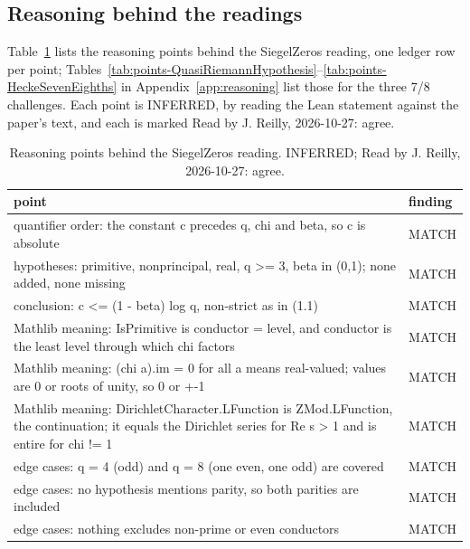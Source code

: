 \subsection{Reasoning behind the readings}

Table~\ref{tab:points-SiegelZeros} lists the reasoning points behind the SiegelZeros reading, one ledger row per point; Tables~\ref{tab:points-QuasiRiemannHypothesis}--\ref{tab:points-HeckeSevenEighths} in Appendix~\ref{app:reasoning} list those for the three 7/8 challenges. %
Each point is INFERRED, by reading the Lean statement against the paper's text, and each is marked Read by J. Reilly, 2026-10-27: agree. %

\begin{table}[!htbp]
\caption{Reasoning points behind the SiegelZeros reading. INFERRED; Read by J. Reilly, 2026-10-27: agree.}\label{tab:points-SiegelZeros} %
\scriptsize\setlength{\tabcolsep}{3pt}\renewcommand{\arraystretch}{0.95}
\begin{tabularx}{\textwidth}{@{}>{\raggedright\arraybackslash}Xl@{}}
\toprule
point & finding \\ %
\midrule
quantifier order: the constant c precedes q, chi and beta, so c is absolute & MATCH \\ %
hypotheses: primitive, nonprincipal, real, q >= 3, beta in (0,1); none added, none missing & MATCH \\ %
conclusion: c <= (1 - beta) log q, non-strict as in (1.1) & MATCH \\ %
Mathlib meaning: IsPrimitive is conductor = level, and conductor is the least level through which chi factors & MATCH \\ %
Mathlib meaning: (chi a).im = 0 for all a means real-valued; values are 0 or roots of unity, so 0 or +-1 & MATCH \\ %
Mathlib meaning: DirichletCharacter.LFunction is ZMod.LFunction, the continuation; it equals the Dirichlet series for Re s > 1 and is entire for chi != 1 & MATCH \\ %
edge cases: q = 4 (odd) and q = 8 (one even, one odd) are covered & MATCH \\ %
edge cases: no hypothesis mentions parity, so both parities are included & MATCH \\ %
edge cases: nothing excludes non-prime or even conductors & MATCH \\ %
\bottomrule
\end{tabularx}
\end{table}

